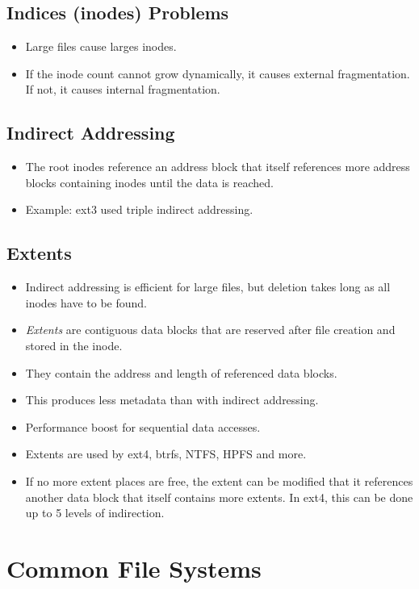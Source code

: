 		\subsection{Indices (inodes) Problems}
			\begin{itemize}
				\item Large files cause larges inodes.
				\item If the inode count cannot grow dynamically, it causes external fragmentation. If not, it causes internal fragmentation.
			\end{itemize}

		\subsection{Indirect Addressing}
			\begin{itemize}
				\item The root inodes reference an address block that itself references more address blocks containing inodes until the data is reached.
				\item Example: ext3 used triple indirect addressing.
			\end{itemize}

		\subsection{Extents}
			\begin{itemize}
				\item Indirect addressing is efficient for large files, but deletion takes long as all inodes have to be found.
				\item \textit{Extents} are contiguous data blocks that are reserved after file creation and stored in the inode.
				\item They contain the address and length of referenced data blocks.
				\item This produces less metadata than with indirect addressing.
				\item Performance boost for sequential data accesses.
				\item Extents are used by ext4, btrfs, NTFS, HPFS and more.
				\item If no more extent places are free, the extent can be modified that it references another data block that itself contains more extents. In ext4, this can be done up to 5 levels of indirection.
			\end{itemize}

	\section{Common File Systems}

